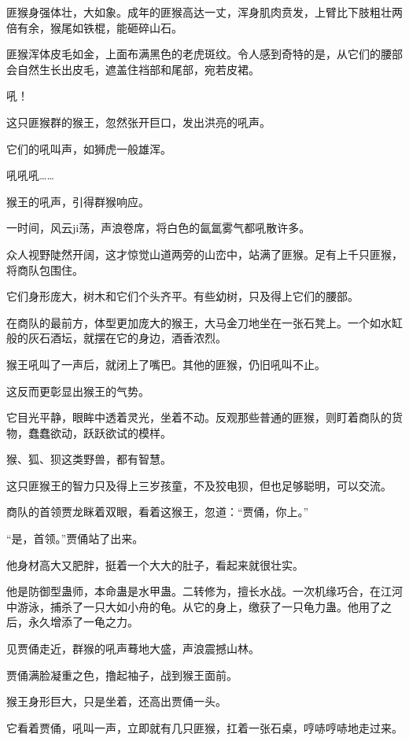 
\begin{this_body}

匪猴身强体壮，大如象。成年的匪猴高达一丈，浑身肌肉贲发，上臂比下肢粗壮两倍有余，猴尾如铁棍，能砸碎山石。

匪猴浑体皮毛如金，上面布满黑色的老虎斑纹。令人感到奇特的是，从它们的腰部会自然生长出皮毛，遮盖住裆部和尾部，宛若皮裙。

吼！

这只匪猴群的猴王，忽然张开巨口，发出洪亮的吼声。

它们的吼叫声，如狮虎一般雄浑。

吼吼吼……

猴王的吼声，引得群猴响应。

一时间，风云ji荡，声浪卷席，将白色的氤氲雾气都吼散许多。

众人视野陡然开阔，这才惊觉山道两旁的山峦中，站满了匪猴。足有上千只匪猴，将商队包围住。

它们身形庞大，树木和它们个头齐平。有些幼树，只及得上它们的腰部。

在商队的最前方，体型更加庞大的猴王，大马金刀地坐在一张石凳上。一个如水缸般的灰石酒坛，就摆在它的身边，酒香浓烈。

猴王吼叫了一声后，就闭上了嘴巴。其他的匪猴，仍旧吼叫不止。

这反而更彰显出猴王的气势。

它目光平静，眼眸中透着灵光，坐着不动。反观那些普通的匪猴，则盯着商队的货物，蠢蠢欲动，跃跃欲试的模样。

猴、狐、狈这类野兽，都有智慧。

这只匪猴王的智力只及得上三岁孩童，不及狡电狈，但也足够聪明，可以交流。

商队的首领贾龙眯着双眼，看着这猴王，忽道：“贾俑，你上。”

“是，首领。”贾俑站了出来。

他身材高大又肥胖，挺着一个大大的肚子，看起来就很壮实。

他是防御型蛊师，本命蛊是水甲蛊。二转修为，擅长水战。一次机缘巧合，在江河中游泳，捕杀了一只大如小舟的龟。从它的身上，缴获了一只龟力蛊。他用了之后，永久增添了一龟之力。

见贾俑走近，群猴的吼声蓦地大盛，声浪震撼山林。

贾俑满脸凝重之色，撸起袖子，战到猴王面前。

猴王身形巨大，只是坐着，还高出贾俑一头。

它看着贾俑，吼叫一声，立即就有几只匪猴，扛着一张石桌，哼哧哼哧地走过来。


\end{this_body}
